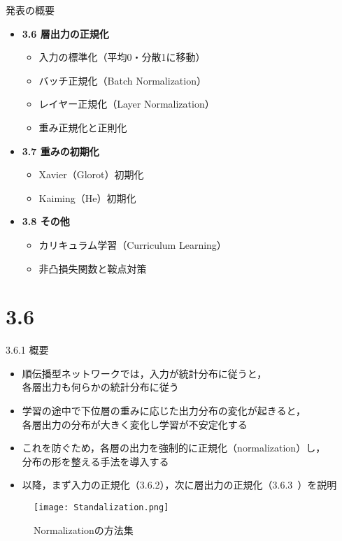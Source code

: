\documentclass[dvipdfmx,autodetect-engine]{beamer}
\title{\papertitle}
\author{\paperauthor}
\institute{\paperaffil}
\date{\paperdate}
\begin{document}

\frame{\titlepage}

\begin{frame}{発表の概要}
  \begin{itemize}
    \item \textbf{3.6 層出力の正規化}
      \begin{itemize}
        \item 入力の標準化（平均0・分散1に移動）
        \item バッチ正規化（Batch Normalization）
        \item レイヤー正規化（Layer Normalization）
        \item 重み正規化と正則化
      \end{itemize}
    \item \textbf{3.7 重みの初期化}
      \begin{itemize}
        \item Xavier（Glorot）初期化
        \item Kaiming（He）初期化
      \end{itemize}
    \item \textbf{3.8 その他}
      \begin{itemize}
        \item カリキュラム学習（Curriculum Learning）
        \item 非凸損失関数と鞍点対策
      \end{itemize}
  \end{itemize}
\end{frame}

\section{3.6}
\begin{frame}{3.6.1 概要}
\small
  \begin{itemize}
    \item 順伝播型ネットワークでは，入力が統計分布に従うと，\\
      各層出力も何らかの統計分布に従う
    \item 学習の途中で下位層の重みに応じた出力分布の変化が起きると，\\
      各層出力の分布が大きく変化し学習が不安定化する
    \item これを防ぐため，各層の出力を強制的に正規化（normalization）し，\\
      分布の形を整える手法を導入する
    \item 以降，まず入力の正規化（3.6.2），次に層出力の正規化（3.6.3~）を説明
  \end{itemize}
  \begin{figure}
      \centering
      \texttt{[image: Standalization.png]}
    \caption*{Normalizationの方法集}
  \end{figure}
\end{frame}
\end{document}
